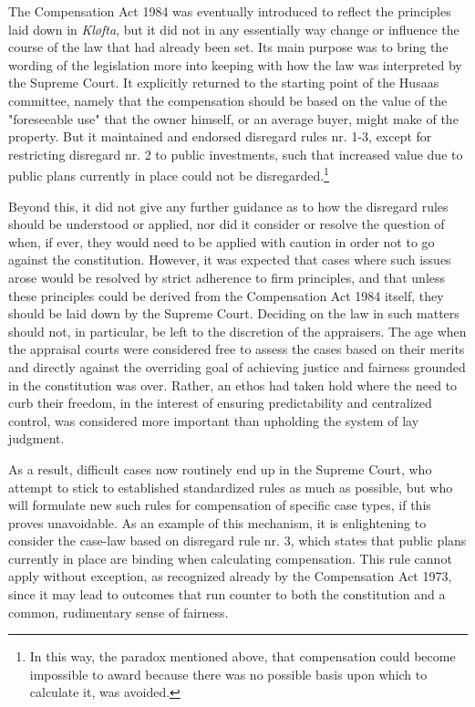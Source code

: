 The Compensation Act 1984 was eventually introduced to reflect the principles laid down in \emph{Kløfta}, but it did not in any essentially way change or influence the course of the law that had already been set. Its main purpose was to bring the wording of the legislation more into keeping with how the law was interpreted by the Supreme Court. It explicitly returned to the starting point of the Husaas committee, namely that the compensation should be based on the value of the "foreseeable use" that the owner himself, or an average buyer, might make of the property. But it maintained and endorsed disregard rules nr. 1-3, except for restricting disregard nr. 2 to public investments, such that increased value due to public plans currently in place could not be disregarded.\footnote{In this way, the paradox mentioned above, that compensation could become impossible to award because there was no possible basis upon which to calculate it, was avoided.}

Beyond this, it did not give any further guidance as to how the disregard rules should be understood or applied, nor did it consider or resolve the question of when, if ever, they would need to be applied with caution in order not to go against the constitution. However, it was expected that cases where such issues arose would be resolved by strict adherence to firm principles, and that unless these principles could be derived from the Compensation Act 1984 itself, they should be laid down by the Supreme Court. Deciding on the law in such matters should not, in particular, be left to the discretion of the appraisers. The age when the appraisal courts were considered free to assess the cases based on their merits and directly against the overriding goal of achieving justice and fairness grounded in the constitution was over. Rather, an ethos had taken hold where the need to curb their freedom, in the interest of ensuring predictability and centralized control, was considered more important than upholding the system of lay judgment. 

As a result, difficult cases now routinely end up in the Supreme Court, who attempt to stick to established standardized rules as much as possible, but who will formulate new such rules for compensation of specific case types, if this proves unavoidable. As an example of this mechanism, it is enlightening to consider the case-law based on disregard rule nr. 3, which states that public plans currently in place are binding when calculating compensation. This rule cannot apply without exception, as recognized already by the Compensation Act 1973, since it may lead to outcomes that run counter to both the constitution and a common, rudimentary sense of fairness. 

